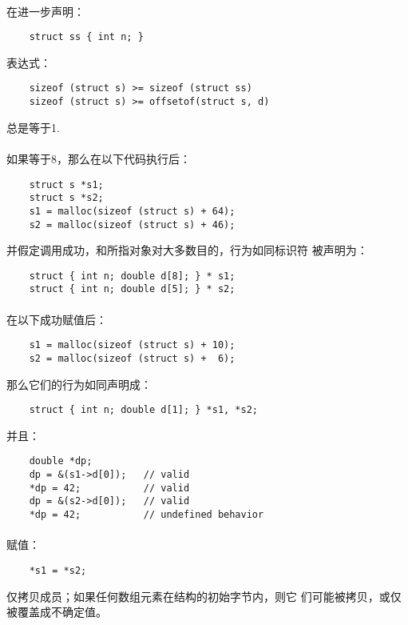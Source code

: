 {\paragraph{}
在进一步声明：
\begin{lstlisting}
    struct ss { int n; }
\end{lstlisting}
表达式：
\begin{lstlisting}
    sizeof (struct s) >= sizeof (struct ss)
    sizeof (struct s) >= offsetof(struct s, d)
\end{lstlisting}
总是等于1.

\paragraph{}
如果等于8，那么在以下代码执行后：
\begin{lstlisting}
    struct s *s1;
    struct s *s2;
    s1 = malloc(sizeof (struct s) + 64);
    s2 = malloc(sizeof (struct s) + 46);
\end{lstlisting}
并假定调用成功，和所指对象对大多数目的，行为如同标识符
被声明为：
\begin{lstlisting}
    struct { int n; double d[8]; } * s1;
    struct { int n; double d[5]; } * s2;
\end{lstlisting}

\paragraph{}
在以下成功赋值后：
\begin{lstlisting}
    s1 = malloc(sizeof (struct s) + 10);
    s2 = malloc(sizeof (struct s) +  6);
\end{lstlisting}
那么它们的行为如同声明成：
\begin{lstlisting}
    struct { int n; double d[1]; } *s1, *s2;
\end{lstlisting}
并且：
\begin{lstlisting}
    double *dp;
    dp = &(s1->d[0]);   // valid
    *dp = 42;           // valid
    dp = &(s2->d[0]);   // valid
    *dp = 42;           // undefined behavior
\end{lstlisting}

\paragraph{}
赋值：
\begin{lstlisting}
    *s1 = *s2;
\end{lstlisting}
仅拷贝成员；如果任何数组元素在结构的初始字节内，则它
们可能被拷贝，或仅被覆盖成不确定值。

}
